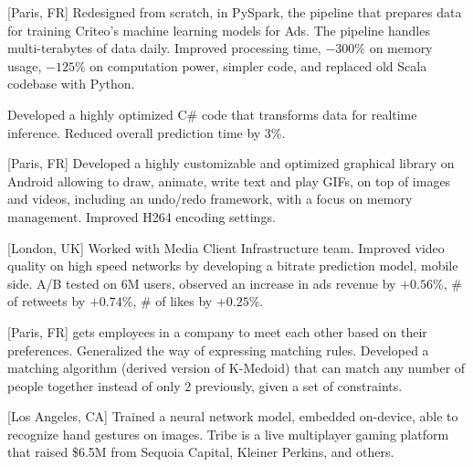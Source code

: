 \documentclass[11pt,a4paper]{article}
\newlength{\cvsidebar}    \setlength{\cvsidebar}{110pt}    %
\newlength{\cvgutter}     \setlength{\cvgutter}{14pt}      %
\newlength{\cventrysep}   \setlength{\cventrysep}{0.40em}  %
\newlength{\cvparsep}     \setlength{\cvparsep}{0.22em}    %
\newlength{\cvulinedepth} \setlength{\cvulinedepth}{1.8pt}
\newlength{\cvulinewidth} \setlength{\cvulinewidth}{0.5pt}
\newcommand{\cvbodyfont}{\footnotesize}
\newcommand{\cvuline}[1]{%
  \begingroup
    \sbox0{#1}%
    \rlap{\raisebox{-\cvulinedepth}{\rule{\wd0}{\cvulinewidth}}}%
    \contour{white}{#1}%
  \endgroup
}
\newcommand{\link}[2]{\href{#1}{\cvuline{#2}}}
\newcommand{\cvgobble}[1]{}
\newenvironment{cventries}{%
  \begin{list}{}{%
    \setlength{\labelwidth}{0pt}%
    \setlength{\labelsep}{0pt}%
    \setlength{\leftmargin}{\dimexpr\cvsidebar+\cvgutter\relax}%
    \setlength{\rightmargin}{0pt}%
    \setlength{\itemindent}{0pt}%
    \setlength{\listparindent}{0pt}%
    \setlength{\topsep}{0pt}%
    \setlength{\partopsep}{0pt}%
    \setlength{\parsep}{\cvparsep}%
    \setlength{\itemsep}{\cventrysep}%
    \let\makelabel\cvgobble
  }%
  \cvbodyfont\raggedright
}{%
  \end{list}%
}
\begin{document}
\begin{cventries}
[Paris, FR]
Redesigned from scratch, in PySpark, the pipeline that prepares data for training Criteo's
machine learning models for Ads. The pipeline handles multi-terabytes of data daily.
Improved processing time, $-300\%$ on memory usage, $-125\%$ on computation power, simpler
code, and replaced old Scala codebase with Python.

Developed a highly optimized C\# code that transforms data for realtime inference. Reduced
overall prediction time by 3\%.

[Paris, FR]
Developed a highly customizable and optimized graphical library on Android allowing to
draw, animate, write text and play GIFs, on top of images and videos, including an
undo/redo framework, with a focus on memory management. Improved H264 encoding settings.

[London, UK]
Worked with Media Client Infrastructure team. Improved video quality on high speed networks
by developing a bitrate prediction model, mobile side. A/B tested on 6M users, observed an
increase in ads revenue by $+0.56\%$, \# of retweets by $+0.74\%$, \# of likes by $+0.25\%$.

[Paris, FR]
\link{https://www.random-coffee.com}{RandomCoffee} gets employees in a company to meet each
other based on their preferences. Generalized the way of expressing matching rules.
Developed a matching algorithm (derived version of K-Medoid) that can match any number of
people together instead of only 2 previously, given a set of constraints.

[Los Angeles, CA]
Trained a neural network model, embedded on-device, able to recognize hand gestures on
images. Tribe is a live multiplayer gaming platform that raised \$6.5M from Sequoia Capital,
Kleiner Perkins, and others.

\end{cventries}

\end{document}
